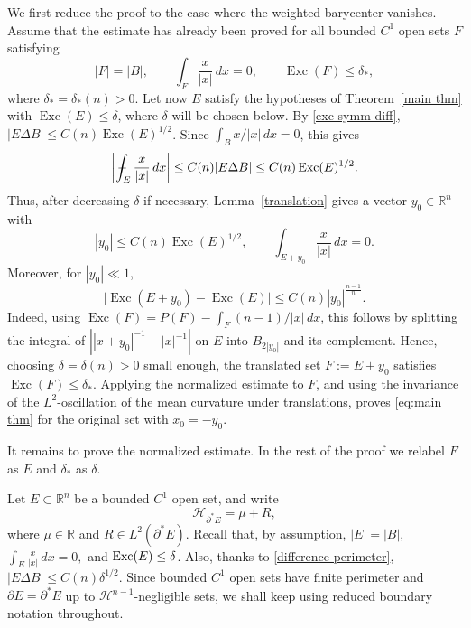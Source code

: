 \documentclass[reqno,11pt]{amsart}
\newcommand{\R}{\mathbb R}
\numberwithin{equation}{section}
\theoremstyle{remark}
\newcommand{\mean}[1]{\,-\hskip-1.08em\int_{#1}} %
\begin{document}
We first reduce the proof to the case where the weighted barycenter vanishes.
Assume that the estimate has already been proved for all bounded $C^1$ open
sets $F$ satisfying
$$
|F|=|B|,\qquad \int_F\frac{x}{|x|}\,dx=0,\qquad
\operatorname{Exc}(F)\le\delta_*,
$$
where $\delta_*=\delta_*(n)>0$.  Let now $E$ satisfy the hypotheses of
Theorem~\ref{main thm} with $\operatorname{Exc}(E)\le\delta$, where $\delta$
will be chosen below. By \eqref{exc symm diff},
$|E\Delta B|\le C(n)\operatorname{Exc}(E)^{1/2}$. Since
$\int_B x/|x|\,dx=0$, this gives
$$
\left|\mean{E}\frac{x}{|x|}\,dx\right|
\le C(n)|E\Delta B|
\le C(n)\operatorname{Exc}(E)^{1/2}.
$$
Thus, after decreasing $\delta$ if necessary, Lemma~\ref{translation} gives a
vector $y_0\in\R^n$ with
$$
|y_0|\le C(n)\operatorname{Exc}(E)^{1/2},
\qquad
\int_{E+y_0}\frac{x}{|x|}\,dx=0.
$$
Moreover, for $|y_0|\ll1$,
$$
\big|\operatorname{Exc}(E+y_0)-\operatorname{Exc}(E)\big|
\le C(n)|y_0|^{\frac{n-1}{n}}.
$$
Indeed, using
$\operatorname{Exc}(F)=P(F)-\int_F (n-1)/|x|\,dx$, this follows by splitting
the integral of
$\left||x+y_0|^{-1}-|x|^{-1}\right|$ on $E$ into $B_{2|y_0|}$ and its
complement. Hence, choosing $\delta=\delta(n)>0$ small enough, the translated
set $F:=E+y_0$ satisfies $\operatorname{Exc}(F)\le\delta_*$. Applying the
normalized estimate to $F$, and using the invariance of the $L^2$-oscillation
of the mean curvature under translations, proves \eqref{eq:main thm} for the
original set with $x_0=-y_0$.

It remains to prove the normalized estimate.  In the rest of the proof we
relabel $F$ as $E$ and $\delta_*$ as $\delta$.

Let $E\subset\mathbb R^n$ be a bounded $C^1$ open set, and write
\begin{equation}\label{mean curvature E}
\mathcal H_{\partial^*E}=\mu +R,
\end{equation}
where $\mu \in \R$ and $R\in L^2(\partial^*E)$.  Recall that, by assumption, $|E|=|B|$,  
$\int_{E} \frac{x}{|x|}\,dx =0, $
and
${\rm Exc}(E)\leq \delta$.
Also, thanks to \eqref{difference perimeter}, $|E\Delta B|\leq C(n)\delta^{1/2}$.
Since bounded $C^1$ open sets have finite perimeter and $\partial E=\partial^*E$ up to $\mathscr H^{n-1}$-negligible sets, we shall keep using reduced boundary notation throughout. 
\end{document}
